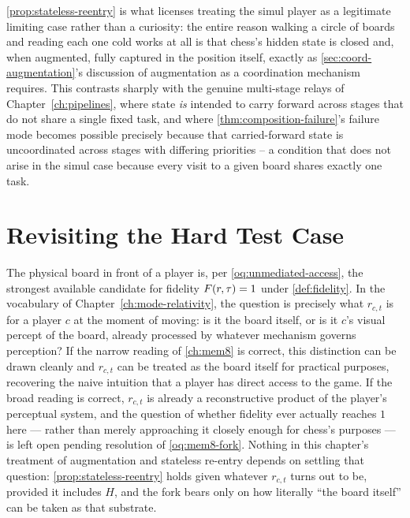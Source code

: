 \cref{prop:stateless-reentry} is what licenses treating the simul player
as a legitimate limiting case rather than a curiosity: the entire reason
walking a circle of boards and reading each one cold works at all is that
chess's hidden state is closed and, when augmented, fully captured in the
position itself, exactly as \cref{sec:coord-augmentation}'s discussion of
augmentation as a coordination mechanism requires. This contrasts sharply
with the genuine multi-stage relays of Chapter~\ref{ch:pipelines}, where
state \emph{is} intended to carry forward across stages that do not share
a single fixed task, and where \cref{thm:composition-failure}'s failure
mode becomes possible precisely because that carried-forward state is
uncoordinated across stages with differing priorities -- a condition that
does not arise in the simul case because every visit to a given board
shares exactly one task.

\section{Revisiting the Hard Test Case}

The physical board in front of a player is, per
\cref{oq:unmediated-access}, the strongest available candidate for
fidelity $F(r,\tau) = 1$ under \cref{def:fidelity}. In the
vocabulary of Chapter~\ref{ch:mode-relativity}, the question is precisely
what $r_{c,t}$ is for a player $c$ at the moment of moving: is it the
board itself, or is it $c$'s visual percept of the board, already
processed by whatever mechanism governs perception? If the narrow reading
of \cref{ch:mem8} is correct, this distinction can be drawn cleanly and
$r_{c,t}$ can be treated as the board itself for practical purposes,
recovering the naive intuition that a player has direct access to the
game. If the broad reading is correct, $r_{c,t}$ is already a
reconstructive product of the player's perceptual system, and the
question of whether fidelity ever actually reaches $1$ here --- rather
than merely approaching it closely enough for chess's purposes --- is
left open pending resolution of \cref{oq:mem8-fork}. Nothing in this
chapter's treatment of augmentation and stateless re-entry depends on
settling that question: \cref{prop:stateless-reentry} holds given
whatever $r_{c,t}$ turns out to be, provided it includes $H$, and the
fork bears only on how literally ``the board itself'' can be taken as
that substrate.
